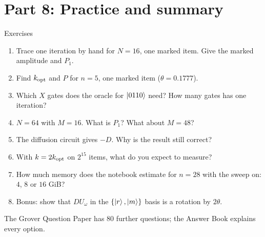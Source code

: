 \documentclass[aspectratio=169,11pt]{beamer}
\newcommand{\kopt}{k_{\rm opt}}
\newcommand{\Uo}{U_\omega}
\begin{document}
\section{Part 8: Practice and summary}
\begin{frame}{Exercises}
  \begin{enumerate}
    \item Trace one iteration by hand for $N = 16$, one marked item. Give the marked amplitude and $P_1$.
    \item Find $\kopt$ and $P$ for $n = 5$, one marked item ($\theta = 0.1777$).
    \item Which $X$ gates does the oracle for $\ket{0110}$ need? How many gates has one iteration?
    \item $N = 64$ with $M = 16$. What is $P_1$? What about $M = 48$?
    \item The diffusion circuit gives $-D$. Why is the result still correct?
    \item With $k = 2\kopt$ on $2^{15}$ items, what do you expect to measure?
    \item How much memory does the notebook estimate for $n = 28$ with the sweep on: $4$, $8$ or $16$ GiB?
    \item Bonus: show that $D\Uo$ in the $\{\ket{r}, \ket{m}\}$ basis is a rotation by $2\theta$.
  \end{enumerate}
  \vspace{2mm}
  \small The Grover Question Paper has 80 further questions; the Answer Book explains every option.
\end{frame}
\end{document}

